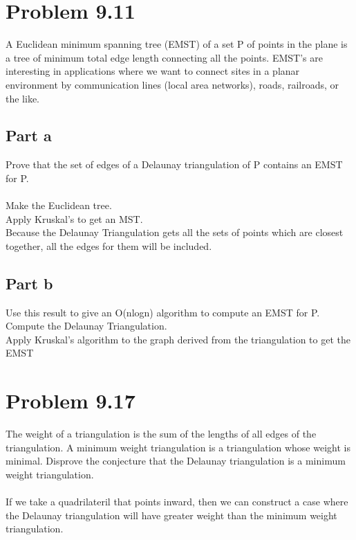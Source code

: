 \documentclass[11pt,psfig]{article}
\begin{document}
\section*{Problem 9.11}

A Euclidean minimum spanning tree (EMST) of a set P of points in the
plane is a tree of minimum total edge length connecting all the points.
EMST’s are interesting in applications where we want to connect sites
in a planar environment by communication lines (local area networks),
roads, railroads, or the like.\\

\subsection*{Part a}
Prove that the set of edges of a Delaunay triangulation of P contains
an EMST for P.\\
\\
Make the Euclidean tree. \\
Apply Kruskal's to get an MST. \\
Because the Delaunay Triangulation gets all the sets of points which are closest together, all the edges for them will be included. 

\subsection*{Part b}
Use this result to give an O(nlogn) algorithm to compute an EMST
for P.\\
Compute the Delaunay Triangulation. \\
Apply Kruskal's algorithm to the graph derived from the triangulation to get the EMST\\

\section*{Problem 9.17}

The weight of a triangulation is the sum of the lengths of all edges of
the triangulation. A minimum weight triangulation is a triangulation
whose weight is minimal. Disprove the conjecture that the Delaunay
triangulation is a minimum weight triangulation.\\
\\
If we take a quadrilateril that points inward, then we can construct a case where the Delaunay triangulation will have greater weight than the minimum weight triangulation.
\end{document}
